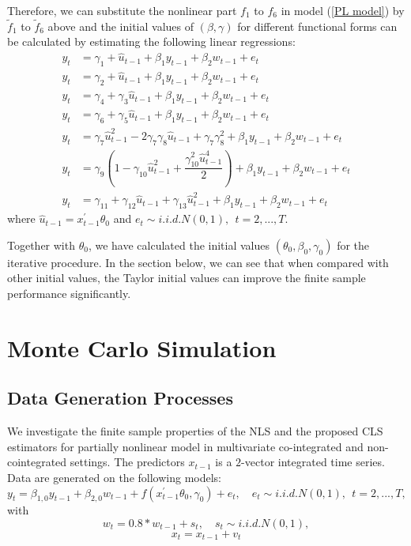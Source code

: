 \documentclass[a4paper,12pt,times,numbered,print,index]{report}
\numberwithin{equation}{section}
\begin{document}
Therefore, we can substitute the nonlinear part $f_1$ to $f_6$ in model (\ref{PL model}) by $\tilde{f}_1$ to $\tilde{f}_6$ above and the initial values of $( \beta, \gamma)$ for different functional forms can be calculated by estimating the following linear regressions:
\begin{align*}
	y_{t} & =  \gamma_{1}  + \hat{u}_{t-1} + \beta_{1}y_{t-1} + \beta_2w_{t-1} + e_t \\
	y_{t} & =  \gamma_{2}  + \hat{u}_{t-1} + \beta_{1}y_{t-1} + \beta_2w_{t-1} + e_t \\
	y_{t} & =  \gamma_{4}  + \gamma_{3}\hat{u}_{t-1} + \beta_{1}y_{t-1} + \beta_2w_{t-1} + e_t\\	
	y_{t} & =  \gamma_{6}  + \gamma_{5}\hat{u}_{t-1} + \beta_{1}y_{t-1} + \beta_2w_{t-1} + e_t \\
	y_{t} & =  \gamma_{7}\hat{u}_{t-1}^2 - 2\gamma_{7}\gamma_{8}\hat{u}_{t-1} + \gamma_{7}\gamma_{8}^2 + \beta_{1}y_{t-1} + \beta_2w_{t-1} + e_t \\
	y_{t} & =  \gamma_{9}(1-\gamma_{10}\hat{u}_{t-1}^2 + \dfrac{\gamma_{10}^2 \hat{u}_{t-1}^4}{2}) + \beta_{1}y_{t-1} + \beta_2w_{t-1} + e_t \\
	y_{t} & =  \gamma_{11}+ \gamma_{12}\hat{u}_{t-1}+\gamma_{13}\hat{u}_{t-1}^{2} +\beta_{1}y_{t-1} + \beta_2w_{t-1} + e_t
\end{align*}
where $\hat{u}_{t-1} = x^{\prime}_{t-1}\theta_0$ and $e_{t}\sim i.i.d.N\left( 0,1\right) ,\ \ t=2,...,T$.

Together with $\theta_0$, we have calculated the initial values $\left(\theta_{0}, \beta_{0}, \gamma_{0} \right) $ for the iterative procedure. In the section below, we can see that when compared with other initial values, the Taylor initial values can improve the finite sample performance significantly.

\section{Monte Carlo Simulation}

\subsection{Data Generation Processes}
	
We investigate the finite sample properties of the NLS and the proposed CLS estimators for partially nonlinear model in multivariate co-integrated and non-cointegrated settings. The predictors $x_{t-1}$ is a $2$-vector integrated time series. Data are generated on the following models:
$$
    y_{t} = \beta_{1,0} y_{t-1} + \beta_{2,0} w_{t-1} + f\left( x_{t-1}^{\prime }\theta _{0},\gamma _{0}\right) +e_{t}, \quad
    e_{t}\sim i.i.d.N\left( 0,1\right) ,\ \ t=2,...,T,
$$
with
$$
	w_{t} = 0.8*w_{t-1} + s_t, \quad
	s_{t}\sim i.i.d.N\left( 0,1\right),
$$
\begin{equation}
	x_t = x_{t-1} + v_t
	\label{xt}
\end{equation}
\end{document}
